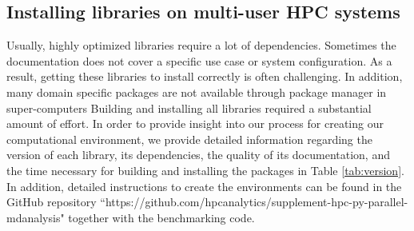 \subsection{Installing libraries on multi-user HPC systems}
Usually, highly optimized libraries require a lot of dependencies. 
Sometimes the documentation does not cover a specific use case or system configuration. 
As a result, getting these libraries to install correctly is often challenging.
In addition, many domain specific packages are not available through package manager in super-computers 
Building and installing all libraries required a substantial amount of effort. 
In order to provide insight into our process for creating our computational environment, we provide detailed information regarding the version of each library, its dependencies, the quality of its documentation, and the time necessary for building and installing the packages in Table \ref{tab:version}. 
In addition, detailed instructions to create the environments can be found in the GitHub repository ``https://github.com/hpcanalytics/supplement-hpc-py-parallel-mdanalysis" together with the benchmarking code.

